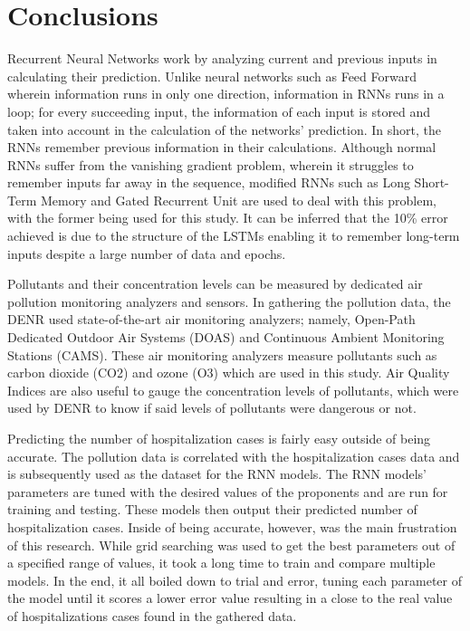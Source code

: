 \documentclass[10pt,11pt,12pt,oneside]{book}
\begin{document}
\section{Conclusions}
Recurrent Neural Networks work by analyzing current and previous inputs in calculating their prediction. Unlike neural networks such as Feed Forward wherein information runs in only one direction, information in RNNs runs in a loop; for every succeeding input, the information of each input is stored and taken into account in the calculation of the networks' prediction. In short, the RNNs remember previous information in their calculations. Although normal RNNs suffer from the vanishing gradient problem, wherein it struggles to remember inputs far away in the sequence, modified RNNs such as Long Short-Term Memory and Gated Recurrent Unit are used to deal with this problem, with the former being used for this study. It can be inferred that the 10\% error achieved is due to the structure of the LSTMs enabling it to remember long-term inputs despite a large number of data and epochs. 

Pollutants and their concentration levels can be measured by dedicated air pollution monitoring analyzers and sensors. In gathering the pollution data, the DENR used state-of-the-art air monitoring analyzers; namely, Open-Path Dedicated Outdoor Air Systems (DOAS) and Continuous Ambient Monitoring Stations (CAMS). These air monitoring analyzers measure pollutants such as carbon dioxide (CO2) and ozone (O3) which are used in this study. Air Quality Indices are also useful to gauge the concentration levels of pollutants, which were used by DENR to know if said levels of pollutants were dangerous or not.

Predicting the number of hospitalization cases is fairly easy outside of being accurate. The pollution data is correlated with the hospitalization cases data and is subsequently used as the dataset for the RNN models. The RNN models' parameters are tuned with the desired values of the proponents and are run for training and testing. These models then output their predicted number of hospitalization cases. Inside of being accurate, however, was the main frustration of this research. While grid searching was used to get the best parameters out of a specified range of values, it took a long time to train and compare multiple models. In the end, it all boiled down to trial and error, tuning each parameter of the model until it scores a lower error value resulting in a close to the real value of hospitalizations cases found in the gathered data. 
\end{document}
